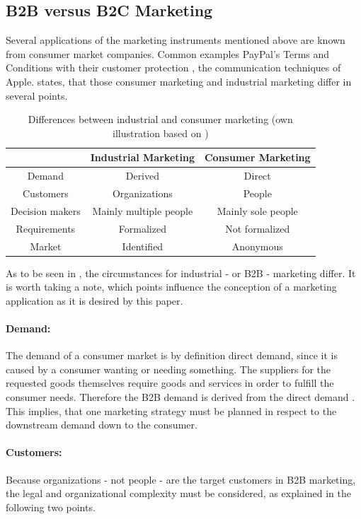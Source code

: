 \subsection{B2B versus B2C Marketing}
Several applications of the marketing instruments mentioned above are known from consumer market companies. Common examples PayPal's Terms and Conditions with their customer protection \parencite[see][]{PayPal}, the communication techniques of Apple. \textcite[20-21]{Backhaus.2015b} states, that those consumer marketing and industrial marketing differ in several points.
\begin{table}[H]
\begin{center}
\begin{tabular}{|c|c|c|}
\hline 
 & Industrial Marketing & Consumer Marketing \\ 
\hline 
Demand & Derived & Direct \\ 
\hline 
Customers & Organizations & People \\ 
\hline 
Decision makers & Mainly multiple people & Mainly sole people \\ 
\hline 
Requirements & Formalized & Not formalized \\ 
\hline 
Market & Identified & Anonymous \\ 
\hline 
\end{tabular} 
\end{center}
\caption[Differences between industrial and consumer marketing]{Differences between industrial and consumer marketing (own illustration based on \protect\cite[21]{Backhaus.2015b})}
\label{tab:marketingdiff}
\end{table}
As to be seen in , the circumstances for industrial - or B2B - marketing differ. It is worth taking a note, which points influence the conception of a marketing application as it is desired by this paper. 
\paragraph*{Demand:} The demand of a consumer market is by definition direct demand, since it is caused by a consumer wanting or needing something. The suppliers for the requested goods themselves require goods and services in order to fulfill the consumer needs. Therefore the B2B demand is derived from the direct demand \parencite[cf.][21]{Backhaus.2015b}. This implies, that one marketing strategy must be planned in respect to the downstream demand down to the consumer. 
\paragraph*{Customers:} Because organizations - not people - are the target customers in B2B marketing, the legal and organizational complexity must be considered, as explained in the following two points.
